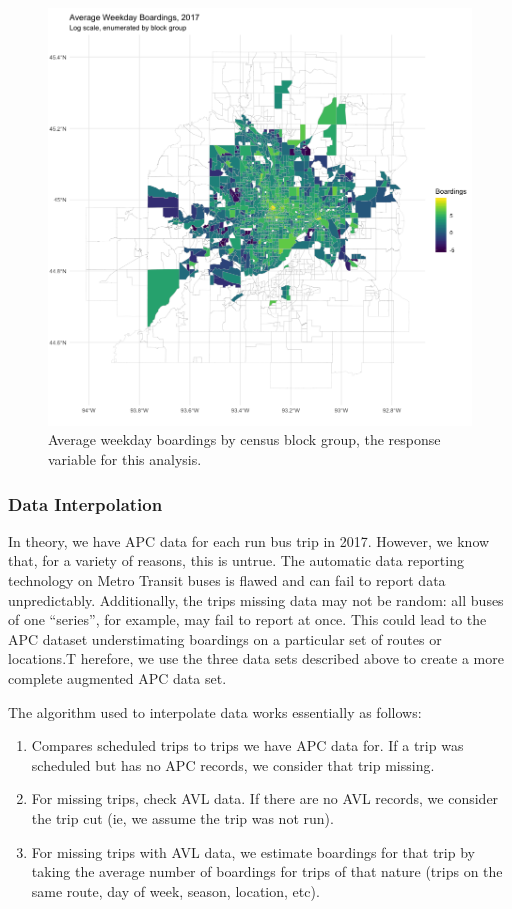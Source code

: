 \documentclass[]{article}
\providecommand{\tightlist}{%
  \setlength{\itemsep}{0pt}\setlength{\parskip}{0pt}}
\begin{document}
\begin{figure}[H]
  \centering
  \includegraphics[width = 5in]{weekdayboardings.png}
  \caption{Average weekday boardings by census block group, the response variable for this analysis.}
\end{figure}

\subsubsection{Data Interpolation}\label{data-interpolation}

In theory, we have APC data for each run bus trip in 2017. However, we
know that, for a variety of reasons, this is untrue. The automatic data
reporting technology on Metro Transit buses is flawed and can fail to
report data unpredictably. Additionally, the trips missing data may not
be random: all buses of one ``series'', for example, may fail to report
at once. This could lead to the APC dataset understimating boardings on
a particular set of routes or locations.T herefore, we use the three
data sets described above to create a more complete augmented APC data
set.

The algorithm used to interpolate data works essentially as follows:

\begin{enumerate}
\def\labelenumi{\arabic{enumi}.}
\tightlist
\item
  Compares scheduled trips to trips we have APC data for. If a trip was
  scheduled but has no APC records, we consider that trip missing.
\item
  For missing trips, check AVL data. If there are no AVL records, we
  consider the trip cut (ie, we assume the trip was not run).
\item
  For missing trips with AVL data, we estimate boardings for that trip
  by taking the average number of boardings for trips of that nature
  (trips on the same route, day of week, season, location, etc).
\end{enumerate}
\end{document}
